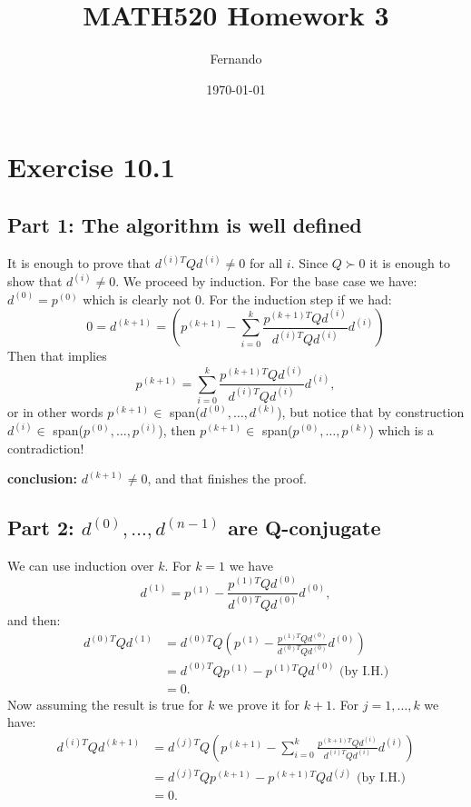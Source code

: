 \documentclass{article}
\begin{document}
\title{MATH520 Homework 3}
\author{Fernando}
\date{\today}
\maketitle

\section*{Exercise 10.1}
\subsection*{Part 1: The algorithm is well defined}
It is enough to prove that $d^{(i)T}Qd^{(i)}\neq 0$ for all $i$. Since $Q\succ
0$ it is enough to show that $d^{(i)}\neq 0$.
We proceed by induction. For the base case we have: $d^{(0)}=p^{(0)}$ which is
clearly not 0. For the induction step if we had:
\[
0=d^{(k+1)}=
\left(p^{(k+1)}-\sum_{i=0}^k\frac{p^{(k+1)T}Qd^{(i)}}{d^{(i)T}Qd^{(i)}}d^{(i)}\right)
\]
Then that implies
\[
p^{(k+1)}=\sum_{i=0}^k\frac{p^{(k+1)T}Qd^{(i)}}{d^{(i)T}Qd^{(i)}}d^{(i)},
\]
or in other words $p^{(k+1)}\in$ span($d^{(0)},\dots,d^{(k)}$), but notice that
by construction $d^{(i)}\in$ span($p^{(0)},\dots,p^{(i)}$), then $p^{(k+1)}\in$
span($p^{(0)},\dots,p^{(k)}$) which is a contradiction!

\textbf{conclusion:} $d^{(k+1)}\neq 0$, and that finishes the proof.
\subsection*{Part 2: $d^{(0)},\dots,d^{(n-1)}$ are Q-conjugate}
We can use induction over $k$. For $k=1$ we have
\[
	d^{(1)}=p^{(1)}-\frac{p^{(1)T}Qd^{(0)}}{d^{(0)T}Qd^{(0)}}d^{(0)},
\]
and then:
\begin{align*}
	d^{(0)T}Qd^{(1)}&=
	d^{(0)T}Q\left(p^{(1)}-\frac{p^{(1)T}Qd^{(0)}}{d^{(0)T}Qd^{(0)}}d^{(0)}\right)\\
	&=
	d^{(0)T}Qp^{(1)}-p^{(1)T}Qd^{(0)} \text{ (by I.H.)}\\
	&=0.
\end{align*}
Now assuming the result is true for $k$ we prove it for $k+1$. For
$j=1,\dots,k$ we have:
\begin{align*}
	d^{(i)T}Qd^{(k+1)}&=
	d^{(j)T}Q\left(p^{(k+1)}-\sum_{i=0}^k\frac{p^{(k+1)T}Qd^{(i)}}{d^{(i)T}Qd^{(i)}}d^{(i)}\right)\\
	&=
	d^{(j)T}Qp^{(k+1)}-p^{(k+1)T}Qd^{(j)} \text{ (by I.H.)}\\
	&=0.
\end{align*}
\end{document}
